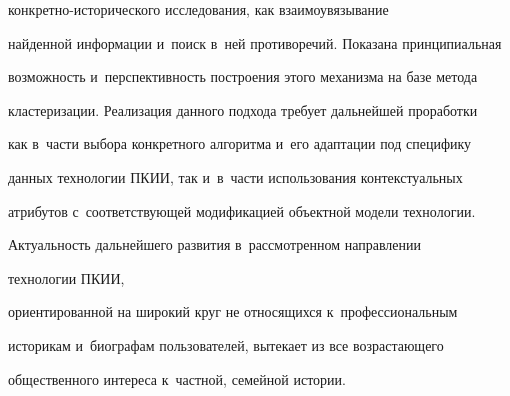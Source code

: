 кон\-крет\-но-ис\-то\-ри\-че\-ско\-го исследования, как взаимоувязывание 


найденной информации и~поиск в~ней противоречий. Показана принципиальная 


возможность и~перспективность построения этого механизма на базе метода 


кластеризации. Реализация данного подхода требует дальнейшей проработки 


как в~части выбора конкретного алгоритма и~его адаптации под специфику 


данных технологии ПКИИ, так и~в~части использования контекстуальных 


атрибутов с~соответствующей модификацией объектной модели технологии.


  


  Актуальность дальнейшего развития в~рассмотренном направлении 


технологии ПКИИ, 


ориентированной на широкий круг не относящихся к~профессиональным 


историкам и~биографам пользователей, вытекает из все возрастающего 


общественного интереса к~частной, семейной истории.


  


